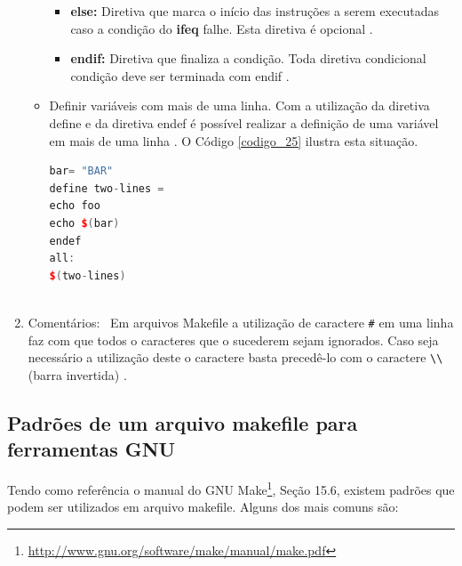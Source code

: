 \begin{enumerate}
\begin{itemize}
\begin{itemize}
        \item \textbf{else:} Diretiva que marca o início das instruções a serem 
    executadas caso a condição do \textbf{ifeq} falhe. Esta diretiva é opcional \cite[pag.77]{ref45}.

        \item \textbf{endif:} Diretiva que finaliza a condição. 
    Toda diretiva condicional condição deve ser terminada com endif \cite[pag.77]{ref45}.
    \end{itemize}

    \item Definir variáveis com mais de uma linha. Com a utilização da diretiva define
 e  da diretiva endef é possível realizar a definição de uma variável em mais
 de uma linha \cite[pag.69]{ref45}. O Código \ref{codigo_25} ilustra esta situação.

    \begin{lstlisting}[language=C++,caption={
			 	Makefile com definição de variável em múltiplas linhas},
														label=codigo_25]
bar= "BAR"
define two-lines =
echo foo
echo $(bar)
endef
all:
$(two-lines)
    
    \end{lstlisting}


    \end{itemize}

    \item Comentários: \
Em arquivos Makefile a utilização de caractere \texttt{\#} em uma linha faz com
 que todos o caracteres que o sucederem sejam ignorados. Caso seja necessário
 a utilização deste o caractere basta precedê-lo com o caractere \texttt{\textbackslash\textbackslash} (barra invertida) \cite[pag]{ref45}.

\end{enumerate}


\subsection{Padrões de um arquivo makefile para ferramentas GNU}

    
Tendo como referência o manual do GNU Make\footnote{
\url{http://www.gnu.org/software/make/manual/make.pdf}},
Seção 15.6, existem padrões que podem ser utilizados em arquivo
 makefile. Alguns dos mais comuns são:

